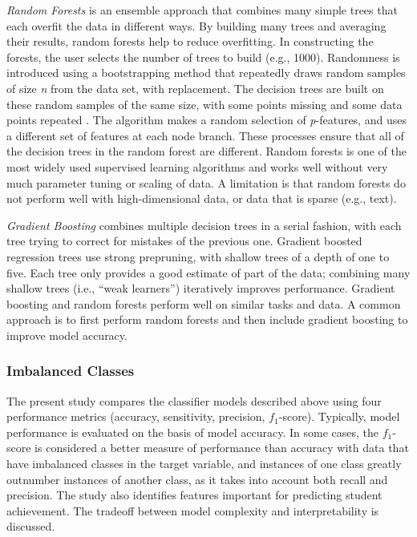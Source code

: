 \documentclass[sigconf]{acmart}
\begin{document}

\emph{Random Forests} is an ensemble approach that combines many simple trees 
that each overfit the data in different ways. By building many trees and 
averaging their results, random forests help to reduce overfitting. In 
constructing the forests, the user selects the number of trees to build 
(e.g., 1000). Randomness is introduced using a bootstrapping method that 
repeatedly draws random samples of size \textit{n} from the data set, with 
replacement. The decision trees are built on these random samples 
of the same size, with some points missing and some data points repeated 
\cite{muller17,raschka17}. The algorithm makes a random selection of 
\textit{p}-features, and uses a different set of features at each node branch. 
These processes ensure that all of the decision trees in the random forest are 
different. Random forests is one of the most widely used supervised learning 
algorithms and works well without very much parameter tuning or scaling of data. 
A limitation is that random forests do not perform well with high-dimensional 
data, or data that is sparse (e.g., text).


\emph{Gradient Boosting} combines multiple decision trees in a serial fashion, 
with each tree trying to correct for mistakes of the previous one. Gradient 
boosted regression trees use strong prepruning, with shallow trees of a depth 
of one to five. Each tree only provides a good estimate of part of the data; 
combining many shallow trees (i.e., ``weak learners'') iteratively improves 
performance. Gradient boosting and random forests perform well on similar tasks 
and data. A common approach is to first perform random forests and then include 
gradient boosting to improve model accuracy. 



\subsubsection{Imbalanced Classes}

The present study compares the classifier models described above using four 
performance metrics (accuracy, sensitivity, precision, $f_1$-score). 
Typically, model performance is evaluated on the basis of model accuracy.
In some cases, the $f_1$-score is considered a better measure of performance 
than accuracy with data that have imbalanced classes in the target variable, 
and instances of one class greatly outnumber instances of another class, 
as it takes into account both recall and precision. The study also identifies 
features important for predicting student achievement. The tradeoff between 
model complexity and interpretability is discussed. 
\end{document}

